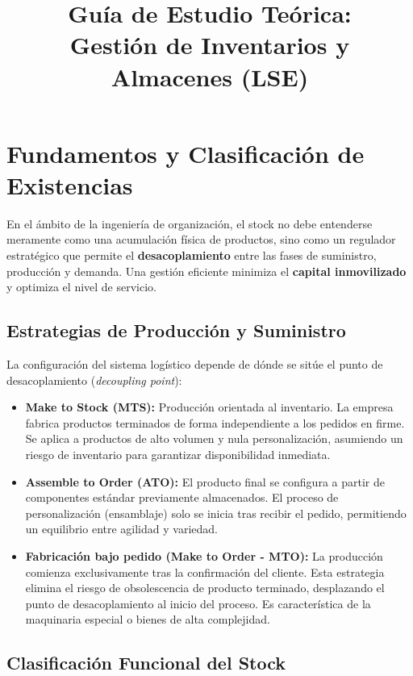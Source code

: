 \documentclass[11pt,a4paper]{article}
\title{Guía de Estudio Teórica:\\Gestión de Inventarios y Almacenes (LSE)}
\author{}
\date{}
\begin{document}
\maketitle

\newpage
\setcounter{tocdepth}{2}
\tableofcontents
\clearpage

\section{Fundamentos y Clasificación de Existencias}

En el ámbito de la ingeniería de organización, el stock no debe entenderse meramente como una acumulación física de productos, sino como un regulador estratégico que permite el \textbf{desacoplamiento} entre las fases de suministro, producción y demanda. Una gestión eficiente minimiza el \textbf{capital inmovilizado} y optimiza el nivel de servicio.

\subsection{Estrategias de Producción y Suministro}

La configuración del sistema logístico depende de dónde se sitúe el punto de desacoplamiento (\emph{decoupling point}):

\begin{itemize}
    \item \textbf{Make to Stock (MTS):} Producción orientada al inventario. La empresa fabrica productos terminados de forma independiente a los pedidos en firme. Se aplica a productos de alto volumen y nula personalización, asumiendo un riesgo de inventario para garantizar disponibilidad inmediata.
    \item \textbf{Assemble to Order (ATO):} El producto final se configura a partir de componentes estándar previamente almacenados. El proceso de personalización (ensamblaje) solo se inicia tras recibir el pedido, permitiendo un equilibrio entre agilidad y variedad.
    \item \textbf{Fabricación bajo pedido (Make to Order - MTO):} La producción comienza exclusivamente tras la confirmación del cliente. Esta estrategia elimina el riesgo de obsolescencia de producto terminado, desplazando el punto de desacoplamiento al inicio del proceso. Es característica de la maquinaria especial o bienes de alta complejidad.

\end{itemize}
\subsection{Clasificación Funcional del Stock}
\end{document}
